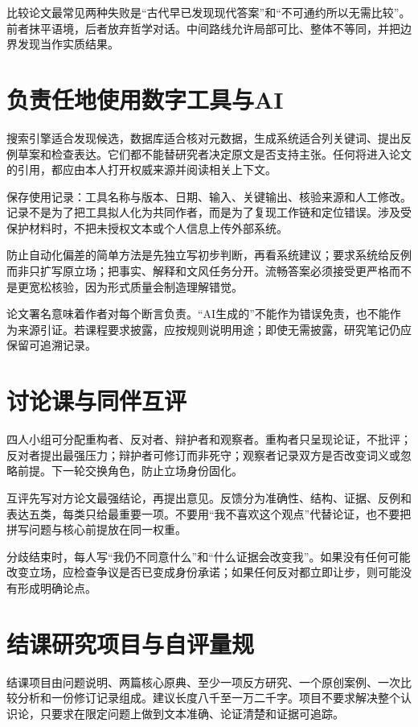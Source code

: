 比较论文最常见两种失败是“古代早已发现现代答案”和“不可通约所以无需比较”。前者抹平语境，后者放弃哲学对话。中间路线允许局部可比、整体不等同，并把边界发现当作实质结果。

\section{负责任地使用数字工具与AI}

搜索引擎适合发现候选，数据库适合核对元数据，生成系统适合列关键词、提出反例草案和检查表达。它们都不能替研究者决定原文是否支持主张。任何将进入论文的引用，都应由本人打开权威来源并阅读相关上下文。

保存使用记录：工具名称与版本、日期、输入、关键输出、核验来源和人工修改。记录不是为了把工具拟人化为共同作者，而是为了复现工作链和定位错误。涉及受保护材料时，不把未授权文本或个人信息上传外部系统。

防止自动化偏差的简单方法是先独立写初步判断，再看系统建议；要求系统给反例而非只扩写原立场；把事实、解释和文风任务分开。流畅答案必须接受更严格而不是更宽松核验，因为形式质量会制造理解错觉。

论文署名意味着作者对每个断言负责。“AI生成的”不能作为错误免责，也不能作为来源引证。若课程要求披露，应按规则说明用途；即使无需披露，研究笔记仍应保留可追溯记录。

\section{讨论课与同伴互评}

四人小组可分配重构者、反对者、辩护者和观察者。重构者只呈现论证，不批评；反对者提出最强压力；辩护者可修订而非死守；观察者记录双方是否改变词义或忽略前提。下一轮交换角色，防止立场身份固化。

互评先写对方论文最强结论，再提出意见。反馈分为准确性、结构、证据、反例和表达五类，每类只给最重要一项。不要用“我不喜欢这个观点”代替论证，也不要把拼写问题与核心前提放在同一权重。

分歧结束时，每人写“我仍不同意什么”和“什么证据会改变我”。如果没有任何可能改变立场，应检查争议是否已变成身份承诺；如果任何反对都立即让步，则可能没有形成明确论点。

\section{结课研究项目与自评量规}

结课项目由问题说明、两篇核心原典、至少一项反方研究、一个原创案例、一次比较分析和一份修订记录组成。建议长度八千至一万二千字。项目不要求解决整个认识论，只要求在限定问题上做到文本准确、论证清楚和证据可追踪。

